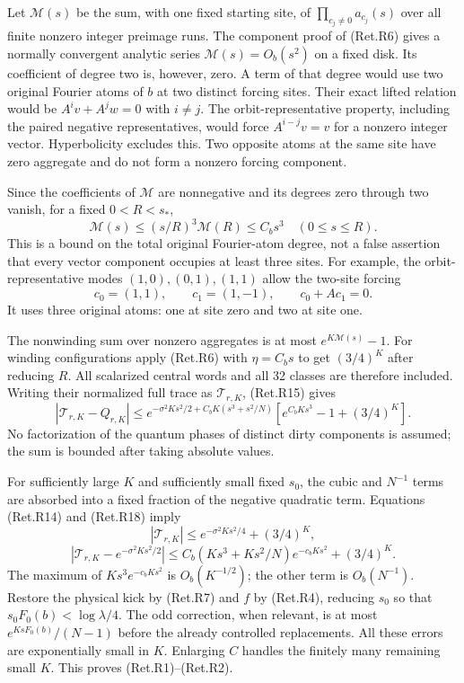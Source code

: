 Let \(\mathcal M(s)\) be the sum, with one fixed starting site, of
\(\prod_{c_j\ne0}a_{c_j}(s)\) over all finite nonzero integer preimage runs.
The component proof of (Ret.R6) gives a normally convergent analytic series
\(\mathcal M(s)=O_b(s^2)\) on a fixed disk.
Its coefficient of degree two is, however, zero.
A term of that degree would use two original Fourier atoms of \(b\)
at two distinct forcing sites. Their exact lifted relation would be
\(A^iv+A^jw=0\) with \(i\ne j\).
The orbit-representative property, including the paired negative
representatives, would force \(A^{i-j}v=v\) for a nonzero integer vector.
Hyperbolicity excludes this.
Two opposite atoms at the same site have zero aggregate and do not
form a nonzero forcing component.

Since the coefficients of \(\mathcal M\) are nonnegative and its degrees
zero through two vanish, for a fixed \(0<R<s_*\),
\[
 \mathcal M(s)\le(s/R)^3\mathcal M(R)\le C_bs^3
                                      \quad(0\le s\le R). \tag{Ret.R17}
\]
This is a bound on the total original Fourier-atom degree, not a false
assertion that every vector component occupies at least three sites.
For example, the orbit-representative modes
\((1,0),(0,1),(1,1)\) allow the two-site forcing
\[
 c_0=(1,1),\qquad c_1=(1,-1),
 \qquad c_0+Ac_1=0.
\]
It uses three original atoms: one at site zero and two at site one.

The nonwinding sum over nonzero aggregates is at most
\(e^{K\mathcal M(s)}-1\). For winding configurations apply (Ret.R6) with
\(\eta=C_bs\) to get \((3/4)^K\) after reducing \(R\).
All scalarized central words and all 32 classes are therefore included.
Writing their normalized full trace as \(\mathcal T_{r,K}\), (Ret.R15) gives
\[
 |\mathcal T_{r,K}-Q_{r,K}|
 \le e^{-\sigma^2Ks^2/2+C_bK(s^3+s^2/N)}
                 \left[e^{C_bKs^3}-1+(3/4)^K\right].       \tag{Ret.R18}
\]
No factorization of the quantum phases of distinct dirty components
is assumed; the sum is bounded after taking absolute values.

For sufficiently large \(K\) and sufficiently small fixed \(s_0\),
the cubic and \(N^{-1}\) terms are absorbed into a fixed fraction of
the negative quadratic term. Equations (Ret.R14) and (Ret.R18) imply
\[
 |\mathcal T_{r,K}|\le e^{-\sigma^2Ks^2/4}+(3/4)^K,
\]
\[
 |\mathcal T_{r,K}-e^{-\sigma^2Ks^2/2}|
       \le C_b(Ks^3+Ks^2/N)e^{-c_bKs^2}+(3/4)^K.           \tag{Ret.R19}
\]
The maximum of \(Ks^3e^{-c_bKs^2}\) is \(O_b(K^{-1/2})\); the other
term is \(O_b(N^{-1})\). Restore the physical kick by (Ret.R7) and \(f\)
by (Ret.R4), reducing \(s_0\) so that \(s_0F_0(b)<\log\lambda/4\).
The odd correction, when relevant, is at most
\(e^{KsF_0(b)}/(N-1)\) before the already controlled replacements.
All these errors are exponentially small in \(K\).
Enlarging \(C\) handles the finitely many remaining small \(K\).
This proves (Ret.R1)--(Ret.R2).

